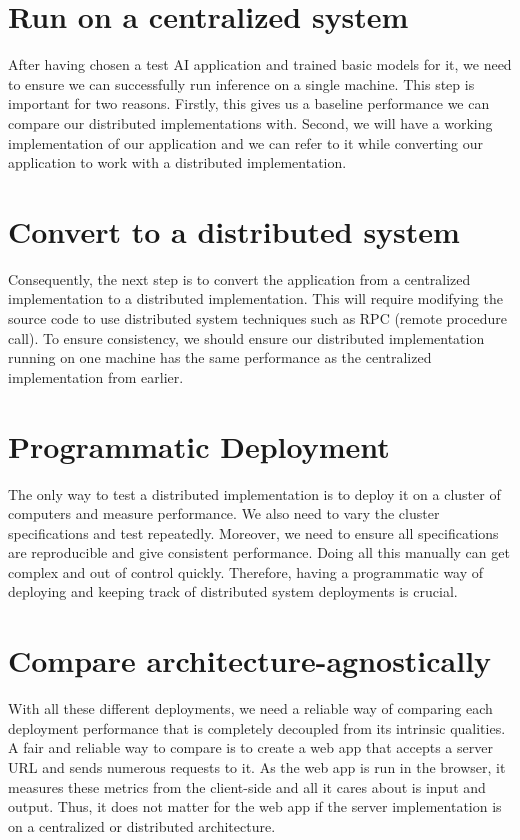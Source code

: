 \documentclass{report}
\begin{document}
\section{Run on a centralized system}
After having chosen a test AI application and trained basic models for it, we need to ensure we can successfully run inference on a single machine.
This step is important for two reasons.
Firstly, this gives us a baseline performance we can compare our distributed implementations with.
Second, we will have a working implementation of our application and we can refer to it while converting our application to work with a distributed implementation.

\section{Convert to a distributed system}
Consequently, the next step is to convert the application from a centralized implementation to a distributed implementation.
This will require modifying the source code to use distributed system techniques such as RPC (remote procedure call).
To ensure consistency, we should ensure our distributed implementation running on one machine has the same performance as the centralized implementation from earlier.

\section{Programmatic Deployment}
The only way to test a distributed implementation is to deploy it on a cluster of computers and measure performance.
We also need to vary the cluster specifications and test repeatedly.
Moreover, we need to ensure all specifications are reproducible and give consistent performance.
Doing all this manually can get complex and out of control quickly.
Therefore, having a programmatic way of deploying and keeping track of distributed system deployments is crucial.

\section{Compare architecture-agnostically}
With all these different deployments, we need a reliable way of comparing each deployment performance that is completely decoupled from its intrinsic qualities.
A fair and reliable way to compare is to create a web app that accepts a server URL and sends numerous requests to it.
As the web app is run in the browser, it measures these metrics from the client-side and all it cares about is input and output.
Thus, it does not matter for the web app if the server implementation is on a centralized or distributed architecture.
\end{document}
